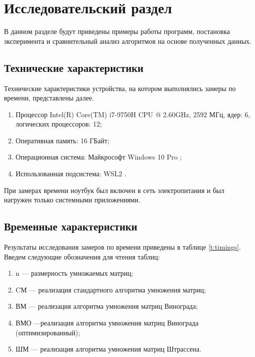 \chapter{Исследовательский раздел}

В данном разделе будут приведены примеры работы программ, постановка эксперимента и сравнительный анализ алгоритмов на основе полученных данных.


\section{Технические характеристики}

Технические характеристики устройства, на котором выполнялись замеры по времени, представлены далее.

\begin{enumerate}
	\item Процессор	Intel(R) Core(TM) i7-9750H CPU @ 2.60GHz, 2592 МГц, ядер: 6, логических процессоров: 12;
	\item Оперативная память: 16 ГБайт;
	\item Операционная система: Майкрософт Windows 10 Pro \cite{windows};
	\item Использованная подсистема: WSL2 \cite{WSL2}.
\end{enumerate}

При замерах времени ноутбук был включен в сеть электропитания и был нагружен только системными приложениями.


\section{Временные характеристики}

Результаты исследования замеров по времени приведены в таблице \ref{t:timings}.
Введем следующие обозначения для чтения таблиц:
\begin{enumerate}
	\item n --- размерность умножаемых матриц;
	\item CМ --- реализация стандартного алгоритма умножения матриц;
	\item ВМ --- реализация алгоритма умножения матриц Винограда;
	\item ВМО ---реализация алгоритма умножения матриц Винограда (оптимизированный);
	\item ШМ --- реализация алгоритма умножения матриц Штрассена.
\end{enumerate}


